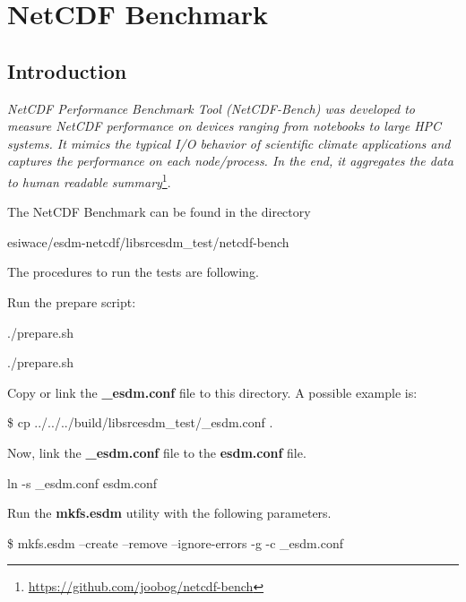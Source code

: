 \chapter{NetCDF Benchmark}
\label{ch:bench}

\section{Introduction}

\tab
\textit{NetCDF Performance Benchmark Tool (NetCDF-Bench) was developed to measure NetCDF performance on devices ranging from notebooks to large HPC systems. It mimics the typical I/O behavior of scientific climate applications and captures the performance on each node/process. In the end, it aggregates the data to human readable summary}\footnote{\url{https://github.com/joobog/netcdf-bench}}.

The NetCDF Benchmark can be found in the directory

\begin{framed}
esiwace/esdm-netcdf/libsrcesdm\_test/netcdf-bench
\end{framed}

The procedures to run the tests are following.

Run the prepare script:

\begin{framed}
./prepare.sh
\end{framed}

\begin{framed}
./prepare.sh
\end{framed}

Copy or link the \textbf{\_esdm.conf} file to this directory. A possible example is:

\begin{framed}
\$ cp ../../../build/libsrcesdm\_test/\_esdm.conf .
\end{framed}

Now, link the \textbf{\_esdm.conf} file to the \textbf{esdm.conf} file.

\begin{framed}
ln -s \_esdm.conf esdm.conf
\end{framed}

Run the \textbf{mkfs.esdm} utility with the following parameters.

\begin{framed}
\$ mkfs.esdm --create --remove --ignore-errors -g -c \_esdm.conf
\end{framed}

